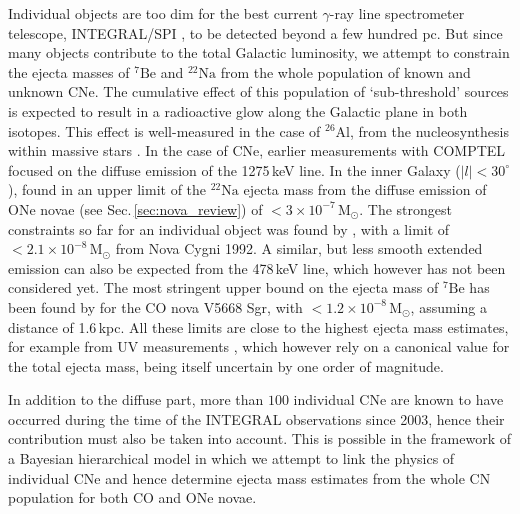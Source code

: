 \documentclass{aa}
\newcommand{\mrm}[1]{\mathrm{#1}}
\newcommand{\nuc}[2]{$\mrm{^{#2}#1}$}
\begin{document}
Individual objects are too dim for the best current $\gamma$-ray line spectrometer telescope, INTEGRAL/SPI \citep{Winkler2003_INTEGRAL,Vedrenne2003_SPI}, to be detected beyond a few hundred pc.
%
But since many objects contribute to the total Galactic luminosity, we attempt to constrain the ejecta masses of \nuc{Be}{7} and \nuc{Na}{22} from the whole population of known and unknown CNe.
%
The cumulative effect of this population of `sub-threshold' sources is expected to result in a radioactive glow along the Galactic plane in both isotopes.
%
This effect is well-measured in the case of \nuc{Al}{26}, from the nucleosynthesis within massive stars \citep[e.g.,][]{Diehl2006_26Al,Bouchet2015_26Al,Pleintinger2019_26Al}.
%
In the case of CNe, earlier measurements with COMPTEL focused on the diffuse emission of the 1275\,keV line.
%
In the inner Galaxy ($|l| < 30^{\circ}$), \citet{Jean2001_ONenovae1275} found in an upper limit of the \nuc{Na}{22} ejecta mass from the diffuse emission of ONe novae (see Sec.\,\ref{sec:nova_review}) of $<3 \times 10^{-7}\,\mrm{M_{\odot}}$.
%
The strongest constraints so far for an individual object was found by \citet{Iyudin1999_NovaCygni1992}, with a limit of $<2.1 \times 10^{-8}\,\mrm{M_{\odot}}$ from Nova Cygni 1992.
%
A similar, but less smooth extended emission can also be expected from the 478\,keV line, which however has not been considered yet.
%
The most stringent upper bound on the ejecta mass of \nuc{Be}{7} has been found by \citet{Siegert2018_V5668Sgr} for the CO nova V5668 Sgr, with $<1.2 \times 10^{-8}\,\mrm{M_{\odot}}$, assuming a distance of 1.6\,kpc.
%
All these limits are close to the highest ejecta mass estimates, for example from UV measurements \citep[e.g.,][finding $<0.7 \times 10^{-8}\,\mrm{M_{\odot}}$ for V5668 Sgr]{Molaro2016_V5668}, which however rely on a canonical value for the total ejecta mass, being itself uncertain by one order of magnitude.

In addition to the diffuse part, more than $100$ individual CNe are known to have occurred during the time of the INTEGRAL observations since 2003, hence their contribution must also be taken into account.
%
This is possible in the framework of a Bayesian hierarchical model \citep{Gelman2013_BDA3} in which we attempt to link the physics of individual CNe and hence determine ejecta mass estimates from the whole CN population for both CO and ONe novae.
\end{document}
